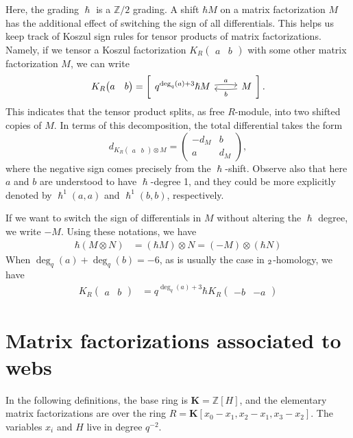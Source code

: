 \documentclass{article}
\newcommand{\Z}{\mathbb{Z}}
\newcommand{\DD}{\mathcal{D}}
\newcommand{\mfshort}[4]{%
  \begin{tikzcd}[ampersand replacement=\&]
    {#1} \arrow[r, "#3", bend left=5,start anchor=east, end anchor=west, shift left=2pt]  \& 
    {#2} \arrow[l,"#4", bend left=5, start anchor=west, end anchor=east, shift left=2pt]
  \end{tikzcd}%
}
\newcommand{\kmf}[2]{
	K_{#1}{\begin{pmatrix}
			#2
		\end{pmatrix}
	}	
}
\theoremstyle{plain} %
\theoremstyle{definition} %
\theoremstyle{remark} %
\begin{document}
Here, the grading $\hslash$ is a $\Z/2$ grading. A shift $\hbar M$ on a matrix factorization $M$ has the additional effect of switching the sign of all differentials. This helps us keep track of Koszul sign rules for tensor products of matrix factorizations. Namely, if we tensor a Koszul factorization $K_{R}\begin{pmatrix} a & b \end{pmatrix}$ with some other matrix factorization $M$, we can write
$$
	\kmf{R}{a & b } 
	=
	\left[ \mfshort{q^{\deg_q(a)+3}\hslash M}{M}{a}{b} \right]
	.
$$
This indicates that the tensor product splits, as free $R$-module, into two shifted copies of $M$. In terms of this decomposition, the total differential takes the form
$$
	d_{\kmf{R}{a & b } \otimes M}  
	=
	\begin{pmatrix}
	   	-d_M & b 
	   	\\ 
	   	a & d_M
	\end{pmatrix}
	,
$$
where the negative sign comes precisely from the $\hslash$-shift. Observe also that here $a$ and $b$ are understood to have $\hslash$-degree 1, and they could be more explicitly denoted by $\hslash^1(a,a)$ and $\hslash^1(b,b)$, respectively.

If we want to switch the sign of differentials in $M$ without altering the $\hslash$ degree, we write $-M$. Using these notations, we have 
\begin{align*}
    \hbar (M\otimes N) 
    &
    = (\hbar M)\otimes N = (-M)\otimes(\hbar N)
\end{align*}
When $\deg_q(a)+\deg_q(b)=-6$, as is usually the case in $\sl_2$-homology, we have
\begin{align*}
    \kmf{R}{a & b} 
    &= q^{\deg_q(a)+3}\hbar \kmf{R}{-b & -a} 
\end{align*}




\section{Matrix factorizations associated to webs}
In the following definitions, the base ring is $\mathbf K=\Z[H]$, and the elementary matrix factorizations are over the ring $R=\mathbf K[x_0-x_1,x_2-x_1,x_3-x_2]$. The variables $x_i$ and $H$ live in degree $q^{-2}$.
\end{document}
